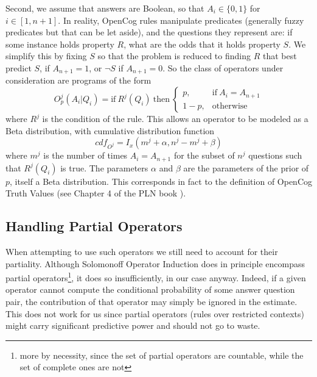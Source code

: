 \documentclass[runningheads]{llncs}
\begin{document}
Second, we assume that answers are Boolean, so that $A_i\in \{0, 1\}$
for $i \in [1, n+1]$. In reality, OpenCog rules manipulate predicates
(generally fuzzy predicates but that can be let aside), and the
questions they represent are: if some instance holds property $R$,
what are the odds that it holds property $S$. We simplify this by
fixing $S$ so that the problem is reduced to finding $R$ that best
predict $S$, if $A_{n+1}=1$, or $\neg S$ if $A_{n+1}=0$. So the class
of operators under consideration are programs of the form
\begin{equation}
O^j_p(A_i|Q_i) = \text{if}\ R^j(Q_i)\ \text{then}\
\begin{cases}
  p, & \text{if}\ A_i = A_{n+1}\\
  1-p, & \text{otherwise}
\end{cases}
\end{equation}
where $R^j$ is the condition of the rule. This allows an operator to
be modeled as a Beta distribution, with cumulative distribution
function
\begin{equation}
  \label{O-cdf}
  cdf_{O^j} = I_x(m^j + \alpha, n^j-m^j+\beta)
\end{equation}
where $m^j$ is 
the number of times $A_i = A_{n+1}$ for the subset of $n^j$
questions such that $R^j(Q_i)$ is true. The parameters $\alpha$ and
$\beta$ are the parameters of the prior of $p$, itself a Beta
distribution. This corresponds in fact to the definition of OpenCog
Truth Values (see Chapter 4 of the PLN book \cite{Goertzel09PLN}).

\subsection{Handling Partial Operators}
When attempting to use such operators we still need to account for
their partiality. Although Solomonoff Operator Induction does in
principle encompass partial operators\footnote{more by necessity,
  since the set of partial operators are countable, while the set of
  complete ones are not}, it does so insufficiently, in our case
anyway. Indeed, if a given operator cannot compute the conditional
probability of some answer question pair, the contribution of that
operator may simply be ignored in the estimate. This does not work for
us since partial operators (rules over restricted contexts) might
carry significant predictive power and should not go to waste.
\end{document}
